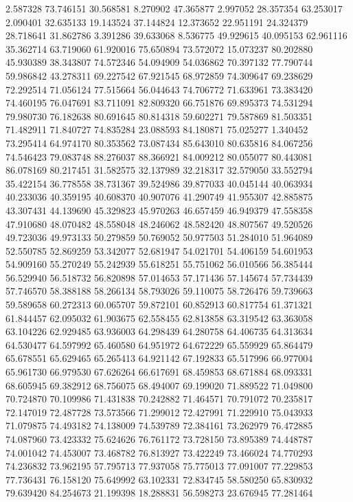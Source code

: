 2.587328
73.746151
30.568581
8.270902
47.365877
2.997052
28.357354
63.253017
2.090401
32.635133
19.143524
37.144824
12.373652
22.951191
24.324379
28.718641
31.862786
3.391286
39.633068
8.536775
49.929615
40.095153
62.961116
35.362714
63.719060
61.920016
75.650894
73.572072
15.073237
80.202880
45.930389
38.343807
74.572346
54.094909
54.036862
70.397132
77.790744
59.986842
43.278311
69.227542
67.921545
68.972859
74.309647
69.238629
72.292514
71.056124
77.515664
56.044643
74.706772
71.633961
73.383420
74.460195
76.047691
83.711091
82.809320
66.751876
69.895373
74.531294
79.980730
76.182638
80.691645
80.814318
59.602271
79.587869
81.503351
71.482911
71.840727
74.835284
23.088593
84.180871
75.025277
1.340452
73.295414
64.974170
80.353562
73.087434
85.643010
80.635816
84.067256
74.546423
79.083748
88.276037
88.366921
84.009212
80.055077
80.443081
86.078169
80.217451
31.582575
32.137989
32.218317
32.579050
33.552794
35.422154
36.778558
38.731367
39.524986
39.877033
40.045144
40.063934
40.233036
40.359195
40.608370
40.907076
41.290749
41.955307
42.885875
43.307431
44.139690
45.329823
45.970263
46.657459
46.949379
47.558358
47.910680
48.070482
48.558048
48.246062
48.582420
48.807567
49.520526
49.723036
49.973133
50.279859
50.769052
50.977503
51.284010
51.964089
52.550785
52.869259
53.342077
52.681947
54.021701
54.406159
54.601953
54.909160
55.270249
55.242939
55.618251
55.751062
56.010566
56.385444
56.529940
56.518732
56.820898
57.014653
57.171436
57.145674
57.734439
57.746570
58.388188
58.266134
58.793026
59.110075
58.726476
59.739663
59.589658
60.272313
60.065707
59.872101
60.852913
60.817754
61.371321
61.844457
62.095032
61.903675
62.558455
62.813858
63.319542
63.363058
63.104226
62.929485
63.936003
64.298439
64.280758
64.406735
64.313634
64.530477
64.597992
65.460580
64.951972
64.672229
65.559929
65.864479
65.678551
65.629465
65.265413
64.921142
67.192833
65.517996
66.977004
65.961730
66.979530
67.626264
66.617691
68.459853
68.671884
68.093331
68.605945
69.382912
68.756075
68.494007
69.199020
71.889522
71.049800
70.724870
70.109986
71.431838
70.242882
71.464571
70.791072
70.235817
72.147019
72.487728
73.573566
71.299012
72.427991
71.229910
75.043933
71.079875
74.493182
74.138009
74.539789
72.384161
73.262979
76.472885
74.087960
73.423332
75.624626
76.761172
73.728150
73.895389
74.448787
74.001042
74.453007
73.468782
76.813927
73.422249
73.466024
74.770293
74.236832
73.962195
57.795713
77.937058
75.775013
77.091007
77.229853
77.736431
76.158120
75.649992
63.102331
72.834745
58.580250
65.830932
79.639420
84.254673
21.199398
18.288831
56.598273
23.676945
77.281464
